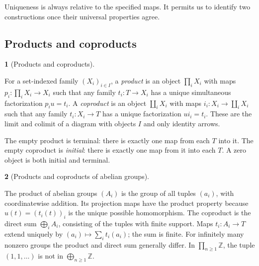 \documentclass[11pt,a4paper]{article}
\newcommand{\mathheading}{}
\theoremstyle{plain}
\theoremstyle{definition}
\newtheorem*{definitionstatement}{\mathheading}
\newenvironment{mathdefinition}[3]{\renewcommand{\mathheading}{#1 #2}\begin{definitionstatement}[#3]}{\end{definitionstatement}}
\begin{document}
Uniqueness is always relative to the specified maps. It permits us to identify two constructions once their universal properties agree.


\subsection{Products and coproducts}

\begin{mathdefinition}{Definition}{2.3}{Products and coproducts}
\label{env-2-3}

For a set-indexed family \((X_i)_{i\in I}\), a \emph{product} is an object \(\prod_iX_i\) with maps \(p_i:\prod_iX_i\to X_i\) such that any family \(t_i:T\to X_i\) has a unique simultaneous factorization \(p_i u=t_i\). A \emph{coproduct} is an object \(\coprod_iX_i\) with maps \(i_i:X_i\to\coprod_iX_i\) such that any family \(t_i:X_i\to T\) has a unique factorization \(u i_i=t_i\). These are the limit and colimit of a diagram with objects \(I\) and only identity arrows.


The empty product is terminal: there is exactly one map from each \(T\) into it. The empty coproduct is \emph{initial}: there is exactly one map from it into each \(T\). A zero object is both initial and terminal.


\par{}\par

\end{mathdefinition}
 
\begin{mathdefinition}{Example}{2.4}{Products and coproducts of abelian groups}
\label{env-2-4}

The product of abelian groups \((A_i)\) is the group of all tuples \((a_i)\), with coordinatewise addition. Its projection maps have the product property because \(u(t)=(t_i(t))_i\) is the unique possible homomorphism. The coproduct is the direct sum \(\bigoplus_i A_i\), consisting of the tuples with finite support. Maps \(t_i:A_i\to T\) extend uniquely by \((a_i)\mapsto\sum_i t_i(a_i)\); the sum is finite. For infinitely many nonzero groups the product and direct sum generally differ. In \(\prod_{n\geq1}\mathbb Z\), the tuple \((1,1,\ldots)\) is not in \(\bigoplus_{n\geq1}\mathbb Z\).


\par{}\par

\end{mathdefinition}
 
\end{document}
